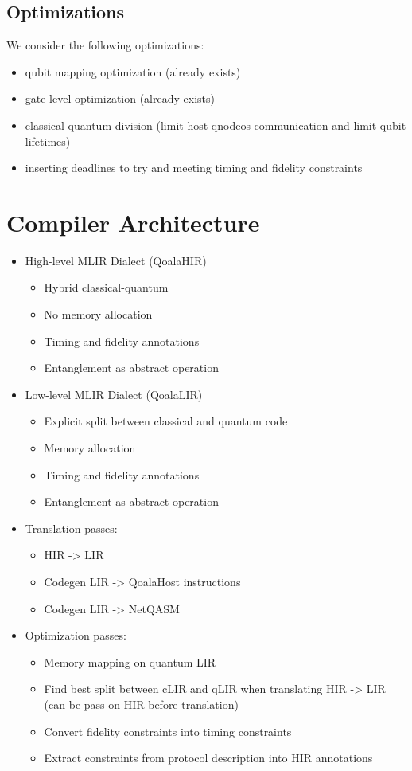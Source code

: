 \subsection{Optimizations}
We consider the following optimizations:
\begin{itemize}
\item qubit mapping optimization (already exists)
\item gate-level optimization (already exists)
\item classical-quantum division (limit host-qnodeos communication and limit qubit lifetimes)
\item inserting deadlines to try and meeting timing and fidelity constraints
\end{itemize}


\section{Compiler Architecture}


\begin{itemize}
\item High-level MLIR Dialect (QoalaHIR)
    \begin{itemize}
        \item Hybrid classical-quantum
        \item No memory allocation
        \item Timing and fidelity annotations
        \item Entanglement as abstract operation
    \end{itemize}
\item Low-level MLIR Dialect (QoalaLIR)
    \begin{itemize}
        \item Explicit split between classical and quantum code
        \item Memory allocation
        \item Timing and fidelity annotations
        \item Entanglement as abstract operation
    \end{itemize}
\item Translation passes:
    \begin{itemize}
        \item HIR -> LIR
        \item Codegen LIR -> QoalaHost instructions
        \item Codegen LIR -> NetQASM
    \end{itemize}
\item Optimization passes:
    \begin{itemize}
        \item Memory mapping on quantum LIR
        \item Find best split between cLIR and qLIR when translating HIR -> LIR (can be pass on HIR before translation)
        \item Convert fidelity constraints into timing constraints
        \item Extract constraints from protocol description into HIR annotations
    \end{itemize}
\end{itemize}

